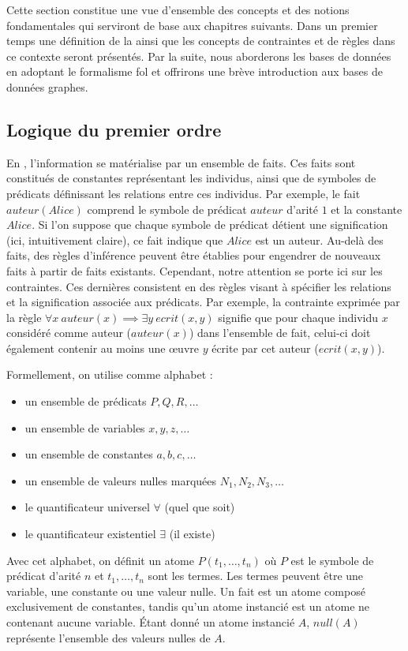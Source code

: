 Cette section constitue une vue d'ensemble des concepts et des notions fondamentales qui serviront de base aux chapitres suivants.
Dans un premier temps une définition de la  ainsi que les concepts de contraintes et de règles dans ce contexte seront présentés.
Par la suite, nous aborderons les bases de données en adoptant le formalisme \gls{fol} et offrirons une brève introduction aux bases de données graphes.

\subsection{Logique du premier ordre}
\label{sec:update:pre:logic}

En , l'information se matérialise par un ensemble de faits.
Ces faits sont constitués de constantes représentant les individus, ainsi que de symboles de prédicats définissant les relations entre ces individus.
Par exemple, le fait $auteur(Alice)$ comprend le symbole de prédicat $auteur$ d'arité $1$ et la constante $Alice$.
Si l'on suppose que chaque symbole de prédicat détient une signification (ici, intuitivement claire), ce fait indique que $Alice$ est un auteur.
Au-delà des faits, des règles d'inférence peuvent être établies pour engendrer de nouveaux faits à partir de faits existants.
Cependant, notre attention se porte ici sur les contraintes.
Ces dernières consistent en des règles visant à spécifier les relations et la signification associée aux prédicats.
Par exemple, la contrainte exprimée par la règle $\forall x~auteur(x) \implies \exists y~ecrit(x,y)$ signifie que pour chaque individu $x$ considéré comme auteur ($auteur(x)$) dans l'ensemble de fait, celui-ci doit également contenir au moins une œuvre $y$ écrite par cet auteur ($ecrit(x,y)$).

Formellement, on utilise comme alphabet :
\begin{itemize}
    \item un ensemble de prédicats $P, Q, R, \dots$
    \item un ensemble de variables $x, y, z, \dots$
    \item un ensemble de constantes $a, b, c, \dots$
    \item un ensemble de valeurs nulles marquées $N_1, N_2, N_3, \dots$
    \item le quantificateur universel $\forall$ (quel que soit)
    \item le quantificateur existentiel $\exists$ (il existe)
\end{itemize}
Avec cet alphabet, on définit un atome $P(t_1, \dots, t_n)$ où $P$ est le symbole de prédicat d'arité $n$ et $t_1, \dots, t_n$ sont les termes.
Les termes peuvent être une variable, une constante ou une valeur nulle.
Un fait est un atome composé exclusivement de constantes, tandis qu'un atome instancié est un atome ne contenant aucune variable.
Étant donné un atome instancié $A$, $null(A)$ représente l'ensemble des valeurs nulles de $A$.

